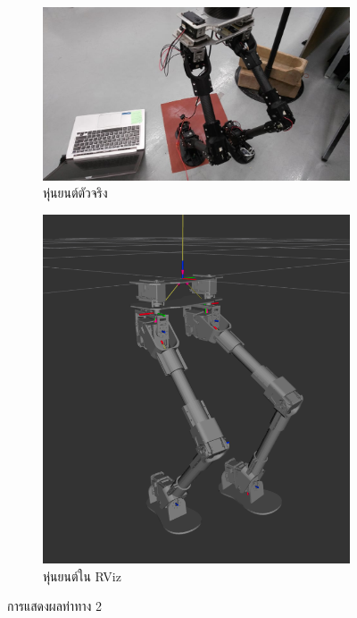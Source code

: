 \begin{figure}[!ht]
    \centering
    \begin{subfigure}[b]{0.45\textwidth}
        \centering
        \includegraphics[width=\textwidth]{chapter4/images/robot_2_rviz2.jpg}
        \caption{หุ่นยนต์ตัวจริง}
    \end{subfigure}
    \hfill
    \begin{subfigure}[b]{0.35\textwidth}
        \centering
        \includegraphics[width=\textwidth]{chapter4/images/robot_2_rviz2.png}
        \caption{หุ่นยนต์ใน RViz}
    \end{subfigure}
    \caption{การแสดงผลท่าทาง 2}
	\label{fig:robot_2_rviz2}
\end{figure}

